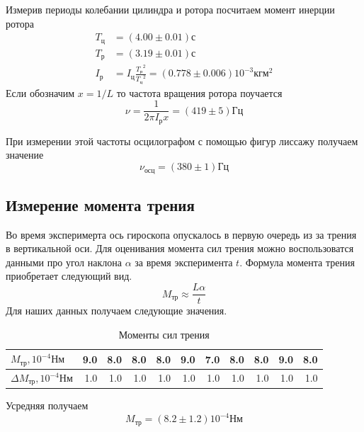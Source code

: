 \documentclass[a4paper, 12pt]{article}
\begin{document}
    Измерив периоды колебании цилиндра и ротора посчитаем момент инерции ротора
    \begin{align*}
     T_{ц} &= (4.00 \pm 0.01)с\\
     T_{р} &= (3.19 \pm 0.01)с\\
     I_{р} &= I_{ц} \frac{{T_р}^2}{{T_ц}^2} = (0.778 \pm 0.006)10^{-3} кгм^2
    \end{align*}
    Если обозначим $x=1/L$ то частота вращения ротора поучается
    \[\nu = \frac{1}{2\pi I_р x} = (419 \pm 5)Гц\]

    При измерении этой частоты осцилографом с помощью фигур лиссажу получаем значение
    \[\nu_{осц}=(380 \pm 1)Гц\]
    \subsection{Измерение момента трения}
    Во время эксперимерта ось гироскопа опускалось в первую очередь из за трения в вертикальной оси. Для оценивания момента сил трения можно воспользоватся данными про угол наклона $\alpha$ за время эксперимента $t$. Формула момента трения приобретает следующий вид.
    \[M_{тр} \approx \frac{L\alpha}{t}\]
    Для наших данных получаем следующие значения.


    \begin{table}[h!]
        \begin{center}
        \begin{tabular}{|l|r|r|r|r|r|r|r|r|r|r|}
        \hline
        $M_{тр}, 10^{-4}Нм$ &  9.0 &  8.0 &  8.0 &  8.0 &  9.0 &  7.0 &  8.0 &  8.0 &  9.0 &  8.0 \\\hline
        $\Delta M_{тр}, 10^{-4}Нм$ &  1.0 &  1.0 &  1.0 &  1.0 &  1.0 &  1.0 &  1.0 &  1.0 &  1.0 &  1.0 \\
        \hline
        \end{tabular}
         \caption{Моменты сил трения}
        \end{center}

    \end{table}
    Усредняя получаем
    \[M_{тр}=(8.2 \pm 1.2) 10^{-4}Нм\]
\end{document}
